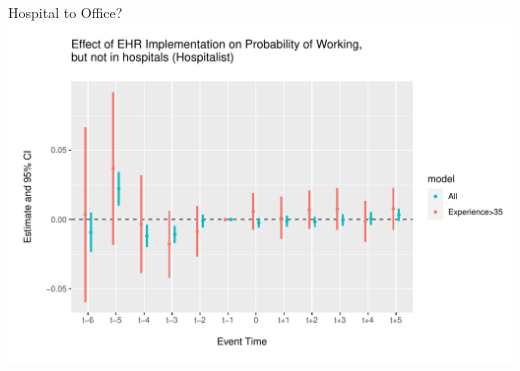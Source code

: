 \documentclass[10pt]{beamer}
\begin{document}
\begin{frame}{Hospital to Office?}
    \centering
    \includegraphics[scale=.5]{Objects/event_hosp_plot_hosp_to_office.pdf}
\end{frame}
\end{document}
